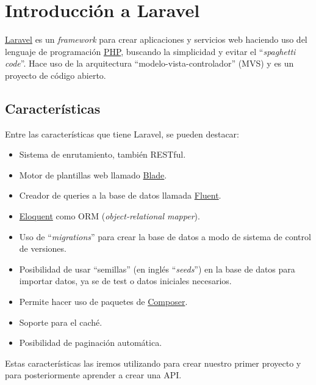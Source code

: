 \chapter{Introducción a Laravel}

\href{https://laravel.com/}{Laravel} es un \textit{framework} para crear aplicaciones y servicios web haciendo uso del lenguaje de programación \href{https://es.wikipedia.org/wiki/PHP}{PHP}, buscando la simplicidad y evitar el “\textit{spaghetti code}”. Hace uso de la arquitectura “modelo-vista-controlador” (MVS) y es un proyecto de código abierto.

\section{Características}
Entre las características que tiene Laravel, se pueden destacar:

\begin{itemize}
    \item Sistema de enrutamiento, también RESTful.
    \item Motor de plantillas web llamado \href{https://laravel.com/docs/10.x/blade}{Blade}.
    \item Creador de queries a la base de datos llamada \href{https://laravel.com/docs/10.x/queries}{Fluent}.
    \item \href{https://laravel.com/docs/10.x/eloquent}{Eloquent} como ORM (\textit{object-relational mapper}).
    \item Uso de “\textit{migrations}” para crear la base de datos a modo de sistema de control de versiones.
    \item Posibilidad de usar “semillas” (en inglés “\textit{seeds}”) en la base de datos para importar datos, ya se de test o datos iniciales necesarios.
    \item Permite hacer uso de paquetes de \href{https://getcomposer.org/}{Composer}.
    \item Soporte para el caché.
    \item Posibilidad de paginación automática.
\end{itemize}

Estas características las iremos utilizando para crear nuestro primer proyecto y para posteriormente aprender a crear una API.
